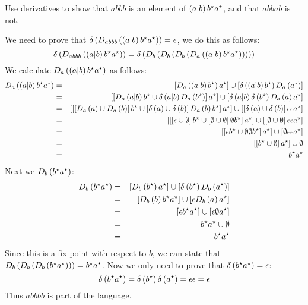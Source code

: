 \documentclass{article}
\begin{document}
\begin{exercise}
Use derivatives to show that $abbb$ is an element of $\left( a|b \right)b^{\star}a^{\star}$, and that $abbab$ is not.
\begin{answer}
We need to prove that $\delta\left( D_{abbb}\left( \left( a|b \right)b^{\star}a^{\star} \right) \right)=\epsilon$, we do this as follows:
\begin{equation}
\delta\left( D_{abbb}\left( \left( a|b \right)b^{\star}a^{\star} \right) \right)=\delta\left( D_b\left( D_b\left( D_b\left( D_a\left( \left( a|b \right)b^{\star}a^{\star} \right) \right) \right) \right) \right)
\end{equation}
We calculate $D_a\left( \left( a|b \right)b^{\star}a^{\star} \right)$ as follows:
\begin{eqnarray}
D_a\left( \left( a|b \right)b^{\star}a^{\star} \right)&=&\left[ D_a\left( \left( a|b \right)b^{\star} \right)a^{\star} \right]\cup\left[ \delta\left( \left( a|b \right)b^{\star} \right)D_a\left( a^{\star} \right) \right]\\
&=&\left[ \left[ D_a\left( a|b \right)b^{\star}\cup\delta\left( a|b \right)D_a\left( b^{\star} \right) \right]a^{\star} \right]\cup\left[ \delta\left( a|b \right)\delta\left( b^{\star} \right)D_a\left( a \right)a^{\star} \right]\\
&=&\left[ \left[ \left[ D_a\left( a \right)\cup D_a\left( b \right) \right]b^{\star}\cup\left[ \delta\left( a \right)\cup\delta\left( b \right) \right]D_a\left( b \right)b^{\star} \right]a^{\star} \right]\cup\left[ \left[ \delta\left( a \right)\cup\delta\left( b \right) \right]\epsilon\epsilon a^{\star} \right]\\
&=&\left[ \left[ \left[ \epsilon\cup\emptyset \right]b^{\star}\cup\left[ \emptyset\cup\emptyset \right]\emptyset b^{\star} \right]a^{\star} \right]\cup\left[ \left[ \emptyset\cup\emptyset \right]\epsilon\epsilon a^{\star} \right]\\
&=&\left[ \left[ \epsilon b^{\star}\cup\emptyset\emptyset b^{\star} \right]a^{\star} \right]\cup\left[ \emptyset\epsilon\epsilon a^{\star} \right]\\
&=&\left[ \left[ b^{\star}\cup\emptyset \right]a^{\star} \right]\cup\emptyset\\
&=&b^{\star}a^{\star}
\end{eqnarray}
Next we $D_b\left( b^{\star}a^{\star} \right)$:
\begin{eqnarray}
D_b\left( b^{\star}a^{\star} \right)&=&\left[ D_b\left( b^{\star} \right)a^{\star} \right]\cup\left[ \delta\left( b^{\star} \right)D_b\left( a^{\star} \right) \right]\\
&=&\left[ D_b\left( b \right)b^{\star}a^{\star} \right]\cup\left[ \epsilon D_b\left( a \right)a^{\star} \right]\\
&=&\left[ \epsilon b^{\star}a^{\star} \right]\cup\left[ \epsilon\emptyset a^{\star} \right]\\
&=&b^{\star}a^{\star}\cup\emptyset\\
&=&b^{\star}a^{\star}
\end{eqnarray}
Since this is a fix point with respect to $b$, we can state that $D_b\left( D_b\left( D_b\left( b^{\star}a^{\star} \right) \right) \right)=b^{\star}a^{\star}$. Now we only need to prove that $\delta\left( b^{\star}a^{\star} \right)=\epsilon$:
\begin{equation}
\delta\left( b^{\star}a^{\star} \right)=\delta\left( b^{\star} \right)\delta\left( a^{\star} \right)=\epsilon\epsilon=\epsilon
\end{equation}
Thus $abbbb$ is part of the language.

\end{answer}
\end{exercise}
\end{document}
